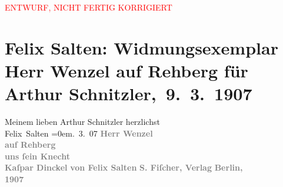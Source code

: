 
\begin{center}
            \textcolor{red}{ENTWURF, NICHT FERTIG KORRIGIERT}
                      \end{center}
            
         \renewcommand{\erwaehnteInstitutionen}{Institutionen: S. Fischer Verlag}
         \renewcommand{\erwaehnteOrte}{Orte: Berlin, Wien}
         \renewcommand{\erwaehnteWerke}{Werke: Herr Wenzel auf Rehberg. Novelle}
               \section[ Felix Salten: Widmungsexemplar Herr Wenzel auf Rehberg für Arthur Schnitzler, 9. 3. 1907]{ Felix Salten: Widmungsexemplar Herr Wenzel auf Rehberg für Arthur
               Schnitzler, 9. 3. 1907}\nopagebreak{}\rehead{ }\begin{ledgroupsized}[t]{13cm}\normalsize\beginnumbering \toendnotes[C]{\smallbreak\pagebreak[2]} 
\pstart
           \noindent{}{\pb}Meinem lieben Arthur Schnitzler\pend
           \pstart
           herzlichst{\\[\baselineskip]}\spacefill\mbox{Felix Salten}\pend
           \leftskip=0em{}. 3. 07\pend
           {\bigskip}\pstart
           \noindent{}\centering{}\textcolor{gray}{\textbf{Herr Wenzel {\\}auf Rehberg {\\}uns ſein Knecht
                     {\\}Kaſpar Dinckel}}\pend
           \pstart
           \noindent{}\centering{}\textcolor{gray}{\textbf{von Felix Salten}}\pend
           {\bigskip}\pstart
           \noindent{}\centering{}\textcolor{gray}{\textbf{S. Fiſcher, Verlag}}\pend
           \pstart
           \noindent{}\centering{}\textcolor{gray}{\textbf{Berlin,}}{ }{\\}\textcolor{gray}{\textbf{1907}}\pend
           
         
         \endnumbering{}\end{ledgroupsized}  \newcommand{\dateiname}{L03046}\newcommand{\titel}{Felix Salten: Widmungsexemplar Herr Wenzel auf Rehberg für Arthur Schnitzler, 9. 3. 1907}\newcommand{\editorInnen}{Martin Anton Müller und Laura Untner}
      